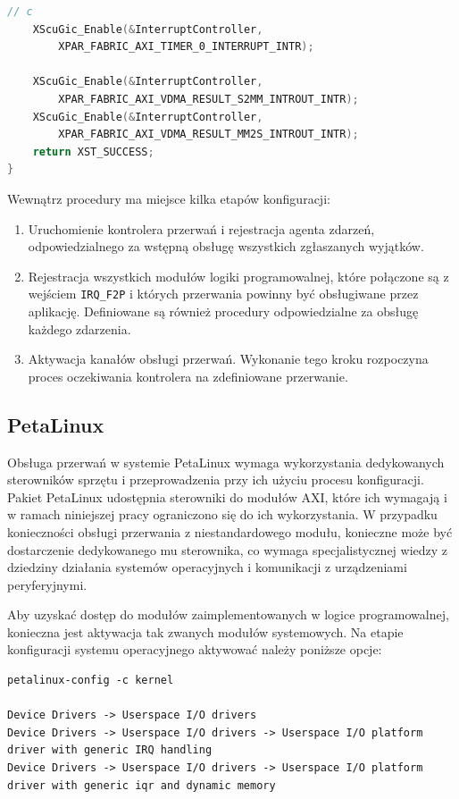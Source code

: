 \begin{enumerate}
\begin{lstlisting}[language=C, caption=Konfiguracja kontrolera przerwań., label=lis:interrupt-controller]
	// c
	XScuGic_Enable(&InterruptController,
		XPAR_FABRIC_AXI_TIMER_0_INTERRUPT_INTR);
	
	XScuGic_Enable(&InterruptController,
		XPAR_FABRIC_AXI_VDMA_RESULT_S2MM_INTROUT_INTR);
	XScuGic_Enable(&InterruptController,
		XPAR_FABRIC_AXI_VDMA_RESULT_MM2S_INTROUT_INTR);
	return XST_SUCCESS;
}
\end{lstlisting}

Wewnątrz procedury ma miejsce kilka etapów konfiguracji:
\begin{enumerate}
	\item Uruchomienie kontrolera przerwań i rejestracja agenta zdarzeń, odpowiedzialnego za wstępną obsługę wszystkich zgłaszanych wyjątków.
	
	\item Rejestracja wszystkich modułów logiki programowalnej, które połączone są z wejściem \texttt{IRQ\_F2P} i których przerwania powinny być obsługiwane przez aplikację. Definiowane są również procedury odpowiedzialne za obsługę każdego zdarzenia.
	
	\item Aktywacja kanałów obsługi przerwań. Wykonanie tego kroku rozpoczyna proces oczekiwania kontrolera na zdefiniowane przerwanie.
\end{enumerate}
\end{enumerate}



\subsection{PetaLinux}

Obsługa przerwań w systemie PetaLinux wymaga wykorzystania dedykowanych sterowników sprzętu i przeprowadzenia przy ich użyciu procesu konfiguracji.
Pakiet PetaLinux udostępnia sterowniki do modułów AXI, które ich wymagają i w ramach niniejszej pracy ograniczono się do ich wykorzystania. 
W przypadku konieczności obsługi przerwania z niestandardowego modułu, konieczne może być dostarczenie dedykowanego mu sterownika, co wymaga specjalistycznej wiedzy z dziedziny działania systemów operacyjnych i komunikacji z urządzeniami peryferyjnymi. 

Aby uzyskać dostęp do modułów zaimplementowanych w logice programowalnej, konieczna jest aktywacja tak zwanych modułów systemowych. 
Na etapie konfiguracji systemu operacyjnego aktywować należy poniższe opcje:

\begin{lstlisting}[breaklines=true, caption=Konfiguracja modułów systemowych.]
petalinux-config -c kernel

Device Drivers -> Userspace I/O drivers
Device Drivers -> Userspace I/O drivers -> Userspace I/O platform driver with generic IRQ handling
Device Drivers -> Userspace I/O drivers -> Userspace I/O platform driver with generic iqr and dynamic memory
\end{lstlisting}


